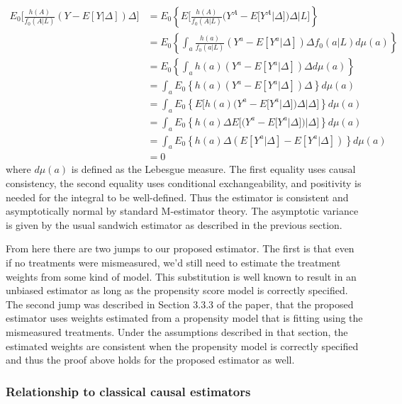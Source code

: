 \documentclass[12pt]{article}
\begin{document}
\begin{align*}
E_{0} \bigg[\frac{h(A)}{f_{0}(A | L)}(Y - E[Y | \Delta])\Delta \bigg] &= E_{0} \left \{ E \bigg[\frac{h(A)}{f_{0}(A | L)}(Y^{A} - E[Y^{A} | \Delta])\Delta | L \bigg] \right \} \\
&= E_{0} \left \{ \int_{a} \frac{h(a)}{f_{0}(a | L)}(Y^{a} - E[Y^{a} | \Delta])\Delta f_{0}(a | L) d\mu (a) \right \} \\
&= E_{0} \left \{ \int_{a} h(a)(Y^{a} - E[Y^{a} | \Delta])\Delta d\mu (a) \right \} \\
&= \int_{a} E_{0} \left \{ h(a)(Y^{a} - E[Y^{a} | \Delta])\Delta \right \} d\mu (a) \\
&= \int_{a} E_{0} \left \{ E \bigg[ h(a)(Y^{a} - E[Y^{a} | \Delta])\Delta | \Delta \bigg] \right \} d\mu (a) \\
&= \int_{a} E_{0} \left \{ h(a)\Delta E \bigg[ (Y^{a} - E[Y^{a} | \Delta]) | \Delta \bigg] \right \} d\mu (a) \\
&= \int_{a} E_{0} \left \{ h(a)\Delta ( E[Y^{a} | \Delta] - E[Y^{a} | \Delta] ) \right \} d\mu (a) \\
&= 0
\end{align*}
where $d\mu (a)$ is defined as the Lebesgue measure. The first equality uses causal consistency, the second equality uses conditional exchangeability, and positivity is needed for the integral to be well-defined. Thus the estimator is consistent and asymptotically normal by standard M-estimator theory. The asymptotic variance is given by the usual sandwich estimator as described in the previous section.

From here there are two jumps to our proposed estimator. The first is that even if no treatments were mismeasured, we'd still need to estimate the treatment weights from some kind of model. This substitution is well known to result in an unbiased estimator as long as the propensity score model is correctly specified. The second jump was described in Section 3.3.3 of the paper, that the proposed estimator uses weights estimated from a propensity model that is fitting using the mismeasured treatments. Under the assumptions described in that section, the estimated weights are consistent when the propensity model is correctly specified and thus the proof above holds for the proposed estimator as well.

\subsubsection{Relationship to classical causal estimators}
\end{document}
